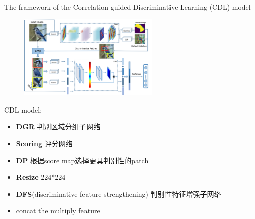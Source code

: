 \begin{frame}{The framework of the Correlation-guided Discriminative Learning (CDL) model}
    \begin{figure}    %
        \centering
        \includegraphics[width=0.6\textwidth]{docs/paperReading/CDL/framework.png}
    \end{figure}

    CDL model:
    \begin{scriptsize}
        \begin{itemize}
            \item \textbf{DGR} 判别区域分组子网络
            \item \textbf{Scoring} 评分网络
            \item \textbf{DP} 根据score map选择更具判别性的patch
            \item \textbf{Resize} 224*224
            \item \textbf{DFS}(discriminative feature strengthening) 判别性特征增强子网络
            \item concat the multiply feature
        \end{itemize}
    \end{scriptsize}    
\end{frame}


